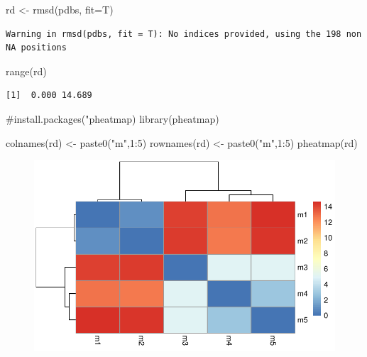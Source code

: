\documentclass[
  letterpaper,
  DIV=11,
  numbers=noendperiod]{scrartcl}
\newenvironment{Shaded}{\begin{snugshade}}{\end{snugshade}}
\newcommand{\AttributeTok}[1]{\textcolor[rgb]{0.40,0.45,0.13}{#1}}
\newcommand{\CommentTok}[1]{\textcolor[rgb]{0.37,0.37,0.37}{#1}}
\newcommand{\DecValTok}[1]{\textcolor[rgb]{0.68,0.00,0.00}{#1}}
\newcommand{\FunctionTok}[1]{\textcolor[rgb]{0.28,0.35,0.67}{#1}}
\newcommand{\NormalTok}[1]{\textcolor[rgb]{0.00,0.23,0.31}{#1}}
\newcommand{\OtherTok}[1]{\textcolor[rgb]{0.00,0.23,0.31}{#1}}
\newcommand{\SpecialCharTok}[1]{\textcolor[rgb]{0.37,0.37,0.37}{#1}}
\newcommand{\StringTok}[1]{\textcolor[rgb]{0.13,0.47,0.30}{#1}}
\begin{document}
\begin{Shaded}
\begin{Highlighting}[]
\NormalTok{rd }\OtherTok{\textless{}{-}} \FunctionTok{rmsd}\NormalTok{(pdbs, }\AttributeTok{fit=}\NormalTok{T)}
\end{Highlighting}
\end{Shaded}

\begin{verbatim}
Warning in rmsd(pdbs, fit = T): No indices provided, using the 198 non NA positions
\end{verbatim}

\begin{Shaded}
\begin{Highlighting}[]
\FunctionTok{range}\NormalTok{(rd)}
\end{Highlighting}
\end{Shaded}

\begin{verbatim}
[1]  0.000 14.689
\end{verbatim}

\begin{Shaded}
\begin{Highlighting}[]
\CommentTok{\#install.packages("pheatmap)}
\FunctionTok{library}\NormalTok{(pheatmap)}

\FunctionTok{colnames}\NormalTok{(rd) }\OtherTok{\textless{}{-}} \FunctionTok{paste0}\NormalTok{(}\StringTok{"m"}\NormalTok{,}\DecValTok{1}\SpecialCharTok{:}\DecValTok{5}\NormalTok{)}
\FunctionTok{rownames}\NormalTok{(rd) }\OtherTok{\textless{}{-}} \FunctionTok{paste0}\NormalTok{(}\StringTok{"m"}\NormalTok{,}\DecValTok{1}\SpecialCharTok{:}\DecValTok{5}\NormalTok{)}
\FunctionTok{pheatmap}\NormalTok{(rd)}
\end{Highlighting}
\end{Shaded}

\begin{figure}[H]

{\centering \includegraphics{Class11INCLASS_files/figure-pdf/unnamed-chunk-19-1.pdf}

}

\end{figure}
\end{document}
